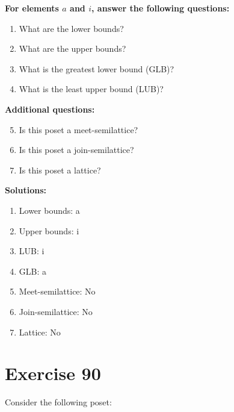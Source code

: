 \documentclass{article}
\begin{document}
    \textbf{For elements $a$ and $i$, answer the following questions:}
\begin{enumerate}
    \item What are the lower bounds?
    \item What are the upper bounds?
    \item What is the greatest lower bound (GLB)?
    \item What is the least upper bound (LUB)?
\end{enumerate}
    \hspace*{3ex} \textbf{Additional questions:}
\begin{enumerate}
    \setcounter{enumi}{4}
    \item Is this poset a meet-semilattice?
    \item Is this poset a join-semilattice?
    \item Is this poset a lattice?
\end{enumerate}

\textbf{Solutions:}
\begin{enumerate}
    \item Lower bounds: {a}
    \item Upper bounds: {i}
    \item LUB: i
    \item GLB: a
    \item Meet-semilattice: No
    \item Join-semilattice: No
    \item Lattice: No
\end{enumerate}
\newpage
\section*{Exercise 90}
Consider the following poset:
\begin{center}
\end{center}
\end{document}
